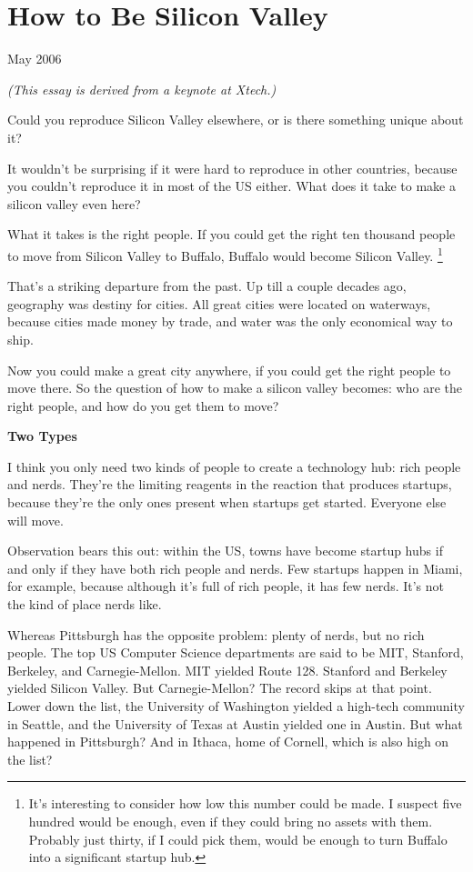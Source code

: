 \chapter{How to Be Silicon Valley}

May 2006

\emph{(This essay is derived from a keynote at Xtech.)}

Could you reproduce Silicon Valley elsewhere, or is there something
unique about it?

It wouldn't be surprising if it were hard to reproduce in other
countries, because you couldn't reproduce it in most of the US either.
What does it take to make a silicon valley even here?

What it takes is the right people. If you could get the right ten
thousand people to move from Silicon Valley to Buffalo, Buffalo would
become Silicon Valley. \footnote{It's interesting to consider how low this number could be made.
I suspect five hundred would be enough, even if they could bring no
assets with them. Probably just thirty, if I could pick them, would be
enough to turn Buffalo into a significant startup hub.}

That's a striking departure from the past. Up till a couple decades ago,
geography was destiny for cities. All great cities were located on
waterways, because cities made money by trade, and water was the only
economical way to ship.

Now you could make a great city anywhere, if you could get the right
people to move there. So the question of how to make a silicon valley
becomes: who are the right people, and how do you get them to move?

\textbf{Two Types}

I think you only need two kinds of people to create a technology hub:
rich people and nerds. They're the limiting reagents in the reaction
that produces startups, because they're the only ones present when
startups get started. Everyone else will move.

Observation bears this out: within the US, towns have become startup
hubs if and only if they have both rich people and nerds. Few startups
happen in Miami, for example, because although it's full of rich people,
it has few nerds. It's not the kind of place nerds like.

Whereas Pittsburgh has the opposite problem: plenty of nerds, but no
rich people. The top US Computer Science departments are said to be MIT,
Stanford, Berkeley, and Carnegie-Mellon. MIT yielded Route 128. Stanford
and Berkeley yielded Silicon Valley. But Carnegie-Mellon? The record
skips at that point. Lower down the list, the University of Washington
yielded a high-tech community in Seattle, and the University of Texas at
Austin yielded one in Austin. But what happened in Pittsburgh? And in
Ithaca, home of Cornell, which is also high on the list?

